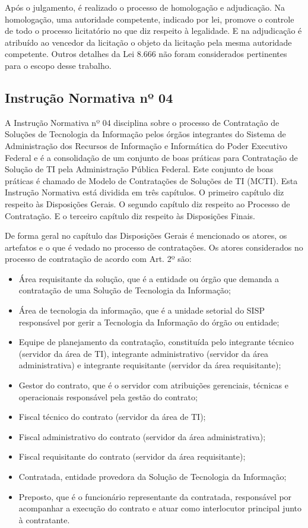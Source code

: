 Após o julgamento, é realizado o processo de homologação e adjudicação. Na homologação, uma autoridade competente, indicado por lei, promove o controle de todo o processo licitatório no que diz respeito à legalidade. E na adjudicação é  atribuído ao vencedor da licitação o objeto da licitação pela mesma autoridade competente. Outros detalhes da Lei 8.666 não foram considerados pertinentes para o escopo desse trabalho.


\subsection[Instrução Normativa nº 04]{Instrução Normativa nº 04}

A Instrução Normativa nº 04 \cite{IN04:2010} disciplina sobre o processo de Contratação de Soluções de Tecnologia da Informação pelos órgãos integrantes do Sistema de Administração dos Recursos de Informação e Informática do Poder  Executivo Federal e é a consolidação de um conjunto de boas práticas para Contratação de Solução de TI pela Administração Pública Federal. Este conjunto de boas práticas é chamado de Modelo de Contratações de Soluções de TI (MCTI). Esta Instrução Normativa está dividida em três capítulos. O primeiro capítulo diz respeito às Disposições Gerais. O segundo capítulo diz respeito ao Processo de Contratação. E o terceiro capítulo diz respeito às Disposições Finais.

De forma geral no capítulo das Disposições Gerais é mencionado os atores, os artefatos e o que é vedado no processo de contratações.  Os atores considerados no processo de contratação de acordo com Art. 2º são: 

\begin{itemize}
\item Área requisitante da solução, que é a entidade ou órgão que demanda a contratação de uma Solução de Tecnologia da Informação; 
\item Área de tecnologia da informação, que é a unidade setorial do SISP responsável por gerir a Tecnologia da Informação do órgão ou entidade;
\item Equipe de planejamento da contratação, constituída pelo integrante técnico (servidor da área de TI), integrante administrativo (servidor da área administrativa) e integrante requisitante (servidor da área requisitante);
\item Gestor do contrato, que é o servidor com atribuições gerenciais, técnicas e operacionais responsável pela gestão do contrato; 
\item Fiscal técnico do contrato (servidor da área de TI); 
\item Fiscal administrativo do contrato (servidor da área administrativa); 
\item Fiscal requisitante do contrato (servidor da área requisitante);
\item Contratada, entidade provedora da Solução de Tecnologia da Informação;
\item Preposto, que é o funcionário representante da contratada, responsável por acompanhar a execução do contrato e atuar como interlocutor principal junto à contratante.
\end{itemize}

